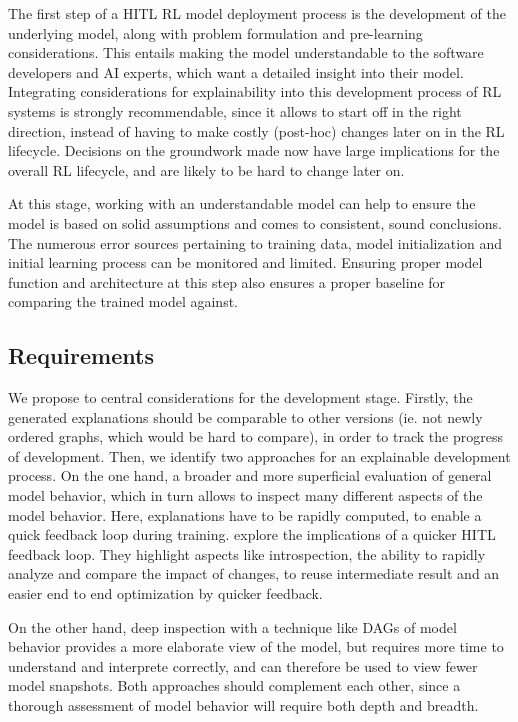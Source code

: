 \documentclass[twoside,11pt]{article}
\begin{document}
The first step of a HITL RL model deployment process is the development of the underlying model, along with problem formulation and pre-learning considerations. This entails making the model understandable to the software developers and AI experts, which want a detailed insight into their model. 
Integrating considerations for explainability into this development process of RL systems is strongly recommendable, since it allows to start off in the right direction, instead of having to make costly (post-hoc) changes later on in the RL lifecycle. Decisions on the groundwork made now have large implications for the overall RL lifecycle, and are likely to be hard to change later on.

At this stage, working with an understandable model can help to ensure the model is based on solid assumptions and comes to consistent, sound conclusions. The numerous error sources pertaining to training data, model initialization and initial learning process can be monitored and limited. Ensuring proper model function and architecture at this step also ensures a proper baseline for comparing the trained model against.

\subsection{Requirements}
We propose to central considerations for the development stage. Firstly, the generated explanations should be comparable to other versions (ie. not newly ordered graphs, which would be hard to compare), in order to track the progress of development. 
Then, we identify two approaches for an explainable development process. On the one hand, a broader and more superficial evaluation of general model behavior, which in turn allows to inspect many different aspects of the model behavior. Here, explanations have to be rapidly computed, to enable a quick feedback loop during training. 
\citet{XinEtAl:2018:HITLMLFeedbackLoop} explore the implications of a quicker HITL feedback loop. They highlight aspects like introspection, the ability to rapidly analyze and compare the impact of changes, to reuse intermediate result and an easier end to end optimization by quicker feedback.

On the other hand, deep inspection with a technique like DAGs of model behavior provides a more elaborate view of the model, but requires more time to understand and interprete correctly, and can therefore be used to view fewer model snapshots. Both approaches should complement each other, since a thorough assessment of model behavior will require both depth and breadth.
\end{document}

